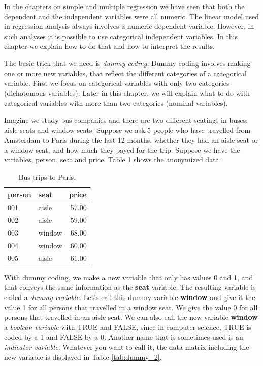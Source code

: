 \documentclass[]{book}\usepackage[]{graphicx}\usepackage[]{color}
\begin{document}
In the chapters on simple and multiple regression we have seen that both the dependent and the independent variables were all numeric. The linear model used in regression analysis always involves a numeric dependent variable. However, in such analyses it is possible to use categorical independent variables. In this chapter we explain how to do that and how to interpret the results. 

The basic trick that we need is \textit{dummy coding}. Dummy coding involves making one or more new variables, that reflect the different categories of a categorical variable. First we focus on categorical variables with only two categories (dichotomous variables). Later in this chapter, we will explain what to do with categorical variables with more than two categories (nominal variables). 

Imagine we study bus companies and there are two different seatings in buses: aisle seats and window seats. Suppose we ask 5 people who have travelled from Amsterdam to Paris during the last 12 months, whether they had an aisle seat or a window seat, and how much they payed for the trip. Suppose we have the variables, person, seat and price. Table \ref{tab:dummy_1} shows the anonymized data.

\begin{table}[ht]
\centering
\caption{Bus trips to Paris.} 
\label{tab:dummy_1}
\begin{tabular}{llr}
  \hline
person & seat & price \\ 
  \hline
001 & aisle & 57.00 \\ 
  002 & aisle & 59.00 \\ 
  003 & window & 68.00 \\ 
  004 & window & 60.00 \\ 
  005 & aisle & 61.00 \\ 
   \hline
\end{tabular}
\end{table}



With dummy coding, we make a new variable that only has values 0 and 1, and that conveys the same information as the \textbf{seat} variable. The resulting variable is called a \textit{dummy variable}. Let's call this dummy variable \textbf{window} and give it the value 1 for all persons that travelled in a window seat. We give the value 0 for all persons that travelled in an aisle seat. We can also call the new variable \textbf{window} a \textit{boolean variable} with TRUE and FALSE, since in computer science, TRUE is coded by a 1 and FALSE by a 0. Another name that is sometimes used is an \textit{indicator variable}. Whatever you want to call it, the data matrix including the new variable is displayed in Table \ref{tab:dummy_2}.
\end{document}
